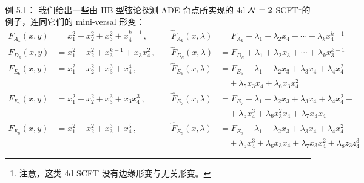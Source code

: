 
\begin{examplebox}{例 5.1：}
  我们给出一些由 IIB 型弦论探测 ADE 奇点所实现的 4d $\mathcal{N}=2$ SCFT\footnote{注意，这类 4d SCFT 没有边缘形变与无关形变。}的例子，连同它们的 mini-versal 形变：
  \begin{equation}
    \begin{aligned}
      F_{A_k}(x,y) &= x_1^2+x_2^2+x_3^2+x_4^{k+1}\,, &\quad
        \hat F_{A_k}(x,\lambda) &= F_{A_k}+\lambda_1+\lambda_2x_4+\cdots+\lambda_kx_4^{k-1}\\[2pt]
      F_{D_k}(x,y) &= x_1^2+x_2^2+x_3^{k-1}+x_3x_4^{2}\,, &\quad
        \hat F_{D_k}(x,\lambda) &= F_{D_k}+\lambda_1+\lambda_2x_3+\cdots+\lambda_kx_3^{k-1}\\[2pt]
      F_{E_6}(x,y) &= x_1^2+x_2^2+x_3^3+x_4^{4}\,, &\quad
        \hat F_{E_6}(x,\lambda) &= F_{E_6}+\lambda_1+\lambda_2x_3+\lambda_3x_4+\lambda_4x_4^2+\\[2pt]
      & & &\quad {}+\lambda_5x_3x_4+\lambda_6x_3x_4^2\\[2pt]
      F_{E_7}(x,y) &= x_1^2+x_2^2+x_3^3+x_3x_4^{3}\,, &\quad
        \hat F_{E_7}(x,\lambda) &= F_{E_7}+\lambda_1+\lambda_2x_3+\lambda_3x_4+\lambda_4x_4^2+\\[2pt]
      & & &\quad {}+\lambda_5x_4^3+\lambda_6x_3^2x_4+\lambda_7x_3x_4\\[2pt]
      F_{E_8}(x,y) &= x_1^2+x_2^2+x_3^3+x_4^{5}\,, &\quad
        \hat F_{E_8}(x,\lambda) &= F_{E_8}+\lambda_1+\lambda_2x_3+\lambda_3x_4+\lambda_4x_4^2+\\[2pt]
      & & &\quad {}+\lambda_5x_4^3+\lambda_6x_3x_4+\lambda_7x_3x_4^2+\lambda_8z_3z_4^3
    \end{aligned}
    \tag{5.9}
  \end{equation}
\end{examplebox}



